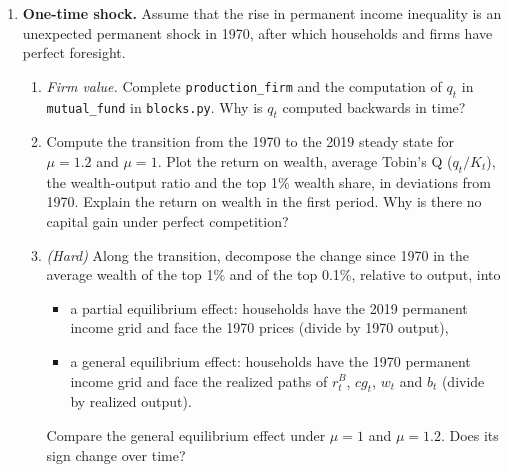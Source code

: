 \begin{enumerate}
\begin{enumerate}
\begin{enumerate}[label=(\roman*)]
\item Solve the household problem with the 1970 permanent income grid and the 2019 prices (markets do not have to clear). Compare the average wealth of the top 1\% and of the top 0.1\% relative to output (the 2019 output, which goes with the 2019 prices), and the top 1\% wealth share, to 1970. What is the impact of the change in prices on wealth inequality under perfect and under imperfect competition? Why?
\end{enumerate}
\end{enumerate}

\item \textbf{One-time shock.} Assume that the rise in permanent income inequality is an unexpected permanent shock in 1970, after which households and firms have perfect foresight.
\begin{enumerate}
\item \emph{Firm value.} Complete \texttt{production\_firm} and the computation of $q_t$ in \texttt{mutual\_fund} in \texttt{blocks.py}. Why is $q_t$ computed backwards in time?
\item Compute the transition from the 1970 to the 2019 steady state for $\mu=1.2$ and $\mu=1$. Plot the return on wealth, average Tobin's Q ($q_t/K_t$), the wealth-output ratio and the top 1\% wealth share, in deviations from 1970.
Explain the return on wealth in the first period. Why is there no capital gain under perfect competition?
\item \emph{(Hard)} Along the transition, decompose the change since 1970 in the average wealth of the top 1\% and of the top 0.1\%, relative to output, into
\begin{itemize}
\item a partial equilibrium effect: households have the 2019 permanent income grid and face the 1970 prices (divide by 1970 output),
\item a general equilibrium effect: households have the 1970 permanent income grid and face the realized paths of $r^B_t$, $cg_t$, $w_t$ and $b_t$ (divide by realized output).
\end{itemize}
Compare the general equilibrium effect under $\mu=1$ and $\mu=1.2$. Does its sign change over time?

\end{enumerate}
\end{enumerate}
